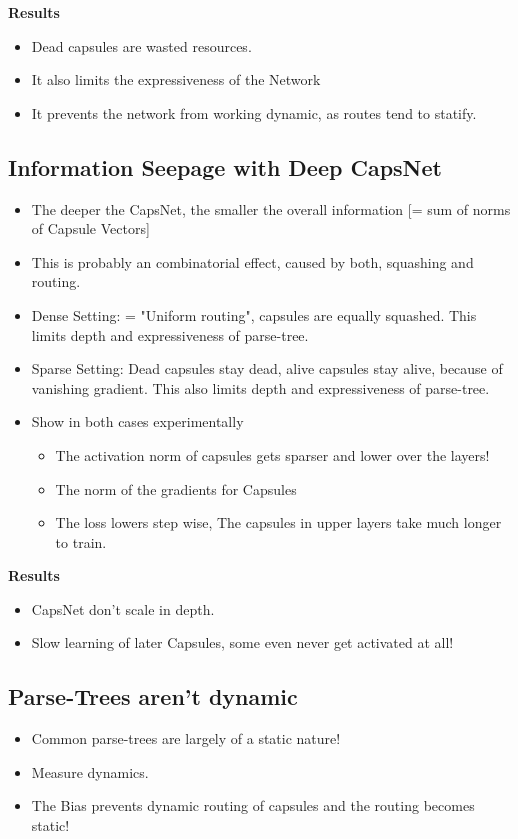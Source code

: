 \documentclass{article}
\begin{document}
\textbf{Results}
\begin{itemize}
	\item Dead capsules are wasted resources.
	\item It also limits the expressiveness of the Network
	\item It prevents the network from working dynamic, as routes tend to statify.
\end{itemize}
\subsection{Information Seepage with Deep CapsNet}
\begin{itemize}
	\item The deeper the CapsNet, the smaller the overall information [= sum of norms of Capsule Vectors]
	\item This is probably an combinatorial effect, caused by both, squashing and routing.
	\item Dense Setting: = "Uniform routing", capsules are equally squashed. This limits depth and expressiveness of parse-tree.
	\item Sparse Setting: Dead capsules stay dead, alive capsules stay alive, because of vanishing gradient. This also limits depth and expressiveness of parse-tree.
	\item Show in both cases experimentally
	\begin{itemize}
		\item The activation norm of capsules gets sparser and lower over the layers!
		\item The norm of the gradients for Capsules
		\item The loss lowers step wise, The capsules in upper layers take much longer to train.
	\end{itemize}
\end{itemize}

\textbf{Results}
\begin{itemize}
	\item CapsNet don't scale in depth.
	\item Slow learning of later Capsules, some even never get activated at all!
\end{itemize}

\subsection{Parse-Trees aren't dynamic}
\begin{itemize}
	\item Common parse-trees are largely of a static nature!
	\item Measure dynamics.
	\item The Bias prevents dynamic routing of capsules and the routing becomes static!
\end{itemize}
\end{document}
